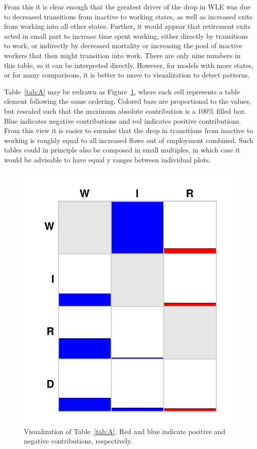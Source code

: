 \documentclass{article}
\begin{document}
From this it is clear enough that the greatest driver of the drop in WLE was due
to decreased transitions from inactive to working states, as well as increased
exits from working into all other states. Further, it would appear that
retirement exits acted in small part to increase time spent working, either
directly by transitions to work, or indirectly by decreased mortality or increasing the pool
of inactive workers that then might transition into work. There are only nine
numbers in this table, so it can be interpreted directly. However, for models
with more states, or for many comparisons, it is better to move to visualization
to detect patterns. 

Table~\ref{tab:A} may be redrawn as Figure~\ref{fig:deca}, where each cell
represents a table element following the same ordering. Colored bars are
proportional to the values, but rescaled such that the maximum absolute
contribution is a 100\% filled box. Blue indicates negative contributions and
red indicates positive contributions. From this view it is easier to surmise
that the drop in transitions from inactive to working is roughly equal to all
increased flows out of employment combined. Such tables could in principle also
be composed in small multiples, in which case it would be advisable to have
equal y ranges between individual plots.

\begin{figure}[ht!]
\begin{center}
\caption{Visualization of Table~\ref{tab:A}. Red and blue indicate positive and
negative contributions, respectively. }
\label{fig:deca}
\includegraphics[scale=.5]{Figures/decA.pdf}
\end{center}
\end{figure}
\end{document}
